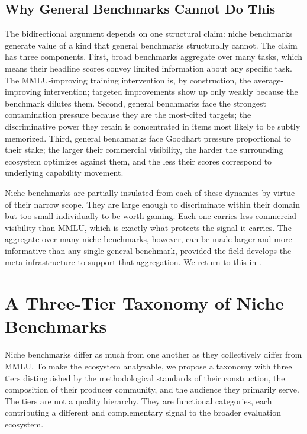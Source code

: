 \documentclass[11pt,a4paper]{article}
\begin{document}
\subsection{Why General Benchmarks Cannot Do This}
\label{sec:generalcannot}

The bidirectional argument depends on one structural claim: niche benchmarks generate value of a kind that general benchmarks structurally cannot. The claim has three components. First, broad benchmarks aggregate over many tasks, which means their headline scores convey limited information about any specific task. The MMLU-improving training intervention is, by construction, the average-improving intervention; targeted improvements show up only weakly because the benchmark dilutes them. Second, general benchmarks face the strongest contamination pressure because they are the most-cited targets; the discriminative power they retain is concentrated in items most likely to be subtly memorized. Third, general benchmarks face Goodhart pressure proportional to their stake; the larger their commercial visibility, the harder the surrounding ecosystem optimizes against them, and the less their scores correspond to underlying capability movement.

Niche benchmarks are partially insulated from each of these dynamics by virtue of their narrow scope. They are large enough to discriminate within their domain but too small individually to be worth gaming. Each one carries less commercial visibility than MMLU, which is exactly what protects the signal it carries. The aggregate over many niche benchmarks, however, can be made larger and more informative than any single general benchmark, provided the field develops the meta-infrastructure to support that aggregation. We return to this in .

\section{A Three-Tier Taxonomy of Niche Benchmarks}
\label{sec:taxonomy}

Niche benchmarks differ as much from one another as they collectively differ from MMLU. To make the ecosystem analyzable, we propose a taxonomy with three tiers distinguished by the methodological standards of their construction, the composition of their producer community, and the audience they primarily serve. The tiers are not a quality hierarchy. They are functional categories, each contributing a different and complementary signal to the broader evaluation ecosystem.
\end{document}

